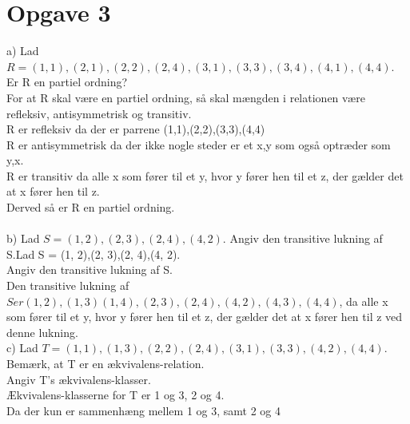 \documentclass{article}
\begin{document}
\section*{Opgave 3}
a) Lad $R = {(1, 1),(2, 1),(2, 2),(2, 4),(3, 1),(3, 3),(3, 4),(4, 1),(4, 4)}$.
Er R en partiel ordning?\\
For at R skal være en partiel ordning, så skal mængden i relationen være refleksiv, antisymmetrisk og transitiv.\\ 
R er refleksiv da der er parrene (1,1),(2,2),(3,3),(4,4)\\
R er antisymmetrisk da der ikke nogle steder er et x,y som også optræder som y,x.\\
R er transitiv da alle x som fører til et y, hvor y fører hen til et z, der gælder det at x fører hen til z. \\
Derved så er R en partiel ordning.\\
\\
b) Lad $S = {(1, 2),(2, 3),(2, 4),(4, 2)}$. Angiv den transitive lukning af S.Lad S = {(1, 2),(2, 3),(2, 4),(4, 2)}. \\ Angiv den transitive lukning af S. \\
Den transitive lukning af $S er {(1, 2),(1,3)(1,4),(2,3),(2, 4),(4, 2),(4,3),(4,4)}$, da alle x som fører til et y, hvor y fører hen til et z, der gælder det at x fører hen til z ved denne lukning.\\

 c) Lad $T = {(1, 1),(1, 3),(2, 2),(2, 4),(3, 1),(3, 3),(4, 2),(4, 4)}$. Bemærk, at T er en ækvivalens-relation. \\Angiv T's ækvivalens-klasser.\\
Ækvivalens-klasserne for T er 1 og 3, 2 og 4.\\
Da der kun er sammenhæng mellem 1 og 3, samt 2 og 4\\
\end{document}
